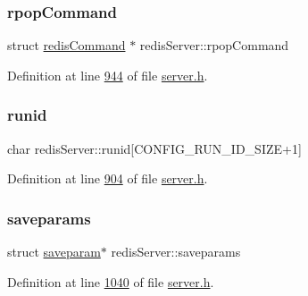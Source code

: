 \mbox{\label{structredisServer_a5519da281f1b673b17d0692f653e7d4e}} 
\subsubsection{\texorpdfstring{rpop\+Command}{rpopCommand}}
{\footnotesize\ttfamily struct \hyperlink{structredisCommand}{redis\+Command} $\ast$ redis\+Server\+::rpop\+Command}



Definition at line \hyperlink{server_8h_source_l00944}{944} of file \hyperlink{server_8h_source}{server.\+h}.

\mbox{\label{structredisServer_a4569eb2644998367f3cc72821fd52716}} 
\subsubsection{\texorpdfstring{runid}{runid}}
{\footnotesize\ttfamily char redis\+Server\+::runid\mbox{[}C\+O\+N\+F\+I\+G\+\_\+\+R\+U\+N\+\_\+\+I\+D\+\_\+\+S\+I\+ZE+1\mbox{]}}



Definition at line \hyperlink{server_8h_source_l00904}{904} of file \hyperlink{server_8h_source}{server.\+h}.

\mbox{\label{structredisServer_ac5db76c12daf6c5ca93e3f1f28d11bc9}} 
\subsubsection{\texorpdfstring{saveparams}{saveparams}}
{\footnotesize\ttfamily struct \hyperlink{structsaveparam}{saveparam}$\ast$ redis\+Server\+::saveparams}



Definition at line \hyperlink{server_8h_source_l01040}{1040} of file \hyperlink{server_8h_source}{server.\+h}.

\mbox{\label{structredisServer_a2d2cd54e1586ea1a895c5101a5dfaf40}} 

